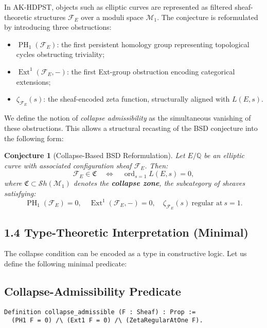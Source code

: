 \documentclass[11pt]{article}
\newtheorem{conjecture}{Conjecture}[section]
\DeclareMathOperator{\Ext}{Ext}
\DeclareMathOperator{\PH}{PH}
\newcommand{\ord}{\operatorname{ord}}
\begin{document}
In AK-HDPST, objects such as elliptic curves are represented as filtered sheaf-theoretic structures \( \mathcal{F}_E \) over a moduli space \( \mathcal{M}_1 \). The conjecture is reformulated by introducing three obstructions:

\begin{itemize}
  \item \( \PH_1(\mathcal{F}_E) \): the first persistent homology group representing topological cycles obstructing triviality;
  \item \( \Ext^1(\mathcal{F}_E, -) \): the first Ext-group obstruction encoding categorical extensions;
  \item \( \zeta_{\mathcal{F}_E}(s) \): the sheaf-encoded zeta function, structurally aligned with \( L(E,s) \).
\end{itemize}

We define the notion of \emph{collapse admissibility} as the simultaneous vanishing of these obstructions. This allows a structural recasting of the BSD conjecture into the following form:

\begin{conjecture}[Collapse-Based BSD Reformulation]
\label{conj:bsd-collapse}
Let \( E/\mathbb{Q} \) be an elliptic curve with associated configuration sheaf \( \mathcal{F}_E \). Then:
\[
\mathcal{F}_E \in \mathfrak{C} \quad \Longleftrightarrow \quad \ord_{s=1} L(E,s) = 0,
\]
where \( \mathfrak{C} \subset \mathcal{S}h(\mathcal{M}_1) \) denotes the \textbf{collapse zone}, the subcategory of sheaves satisfying:
\[
\PH_1(\mathcal{F}_E) = 0, \quad \Ext^1(\mathcal{F}_E, -) = 0, \quad \zeta_{\mathcal{F}_E}(s)~\text{regular at}~s=1.
\]
\end{conjecture}

\subsection*{1.4 Type-Theoretic Interpretation (Minimal)}

The collapse condition can be encoded as a type in constructive logic. Let us define the following minimal predicate:

\subsection*{Collapse-Admissibility Predicate}

\begin{lstlisting}[language=Coq]
Definition collapse_admissible (F : Sheaf) : Prop :=
  (PH1 F = 0) /\ (Ext1 F = 0) /\ (ZetaRegularAtOne F).
\end{lstlisting}
\end{document}
